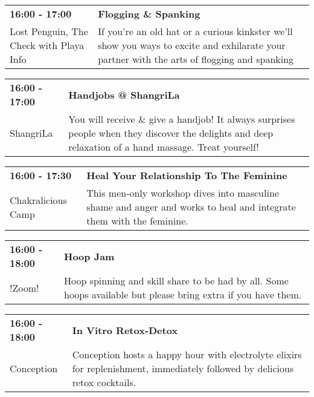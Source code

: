 \begin{tabular}{ p{1in} p{2.2in} }
    \textbf{16:00 - 17:00} & \textbf{Flogging \& Spanking} \\
    Lost Penguin, The \newline Check with Playa Info & If you're an old hat or a curious kinkster we'll show you ways to excite and exhilarate your partner with the arts of flogging and spanking \\
    \hline 
\end{tabular}
    
\begin{tabular}{ p{1in} p{2.2in} }
    \textbf{16:00 - 17:00} & \textbf{Handjobs @ ShangriLa} \\
    ShangriLa \newline  & You will receive \& give a handjob! It always surprises people when they discover the delights and deep relaxation of a hand massage. Treat yourself! \\
    \hline 
\end{tabular}
    
\begin{tabular}{ p{1in} p{2.2in} }
    \textbf{16:00 - 17:30} & \textbf{Heal Your Relationship To The Feminine} \\
    Chakralicious Camp \newline  & This men-only workshop dives into masculine shame and anger and works to heal and integrate them with the feminine. \\
    \hline 
\end{tabular}
    
\begin{tabular}{ p{1in} p{2.2in} }
    \textbf{16:00 - 18:00} & \textbf{Hoop Jam} \\
    !Zoom! \newline  & Hoop spinning and skill share to be had by all.  Some hoops available but please bring extra if you have them. \\
    \hline 
\end{tabular}
    
\begin{tabular}{ p{1in} p{2.2in} }
    \textbf{16:00 - 18:00} & \textbf{In Vitro Retox-Detox} \\
    Conception \newline  & Conception hosts a happy hour with electrolyte elixirs for replenishment, immediately followed by delicious retox cocktails. \\
    \hline 
\end{tabular}
    
